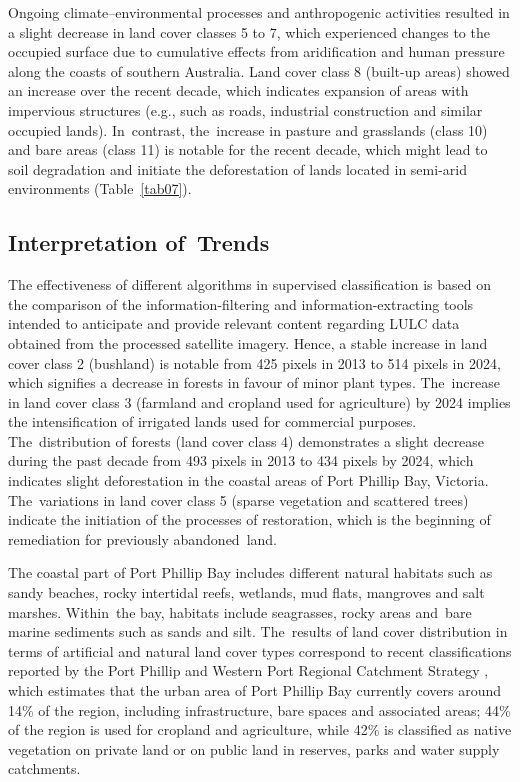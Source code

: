 \documentclass[jmse,article,accept,pdftex,oneauthor]{Definitions/mdpi}
\begin{document}
Ongoing climate--environmental processes and anthropogenic activities resulted in a slight decrease in land cover classes 5 to 7, which experienced changes to the occupied surface due to cumulative effects from aridification and human pressure along the coasts of southern Australia. Land cover class 8 (built-up areas) showed an increase over the recent decade, which indicates expansion of areas with impervious structures (e.g., such as roads, industrial construction and similar occupied lands). In~contrast, the~increase in pasture and grasslands (class 10) and bare areas (class 11) is notable for the recent decade, which might lead to soil degradation and initiate the deforestation of lands located in semi-arid environments (Table~\ref{tab07}). 

\subsection{Interpretation of~Trends}
{The effectiveness of different algorithms in supervised classification is based on the comparison of the information-filtering and information-extracting tools intended to anticipate  and provide relevant content regarding LULC data obtained from the processed satellite imagery. Hence, }a stable increase in land cover class 2 (bushland) is notable from 425 pixels in 2013 to 514 pixels in 2024, which signifies a decrease in forests in favour of minor plant types. The~increase in land cover class 3 (farmland and cropland used for agriculture) by 2024 implies the intensification of irrigated lands used for commercial purposes. The~distribution of forests (land cover class 4) demonstrates a slight decrease during the past decade from 493 pixels in 2013 to 434 pixels by 2024, which indicates slight deforestation in the coastal areas of Port Phillip Bay, Victoria. %
The~variations in land cover class 5 (sparse vegetation and scattered trees) indicate the initiation of the processes of restoration, which is the beginning of remediation for previously abandoned~land. %

{The coastal part of Port Phillip Bay includes different natural habitats such as sandy beaches, rocky intertidal reefs, wetlands, mud flats, mangroves and salt marshes. Within~the bay, habitats include seagrasses, rocky areas and~bare marine sediments such as sands and silt. The~results of land cover distribution in terms of artificial and natural land cover types correspond to recent classifications reported by the Port Phillip and Western Port Regional Catchment Strategy} \cite{PPWPRC}, {which estimates that the urban area of Port Phillip Bay currently covers around 14}\% {of the region, including infrastructure, bare spaces and associated areas; 44}\% {of the region is used for cropland and agriculture, while 42}\% {is classified as native vegetation on private land or on public land in reserves, parks and water supply catchments.}
\end{document}
